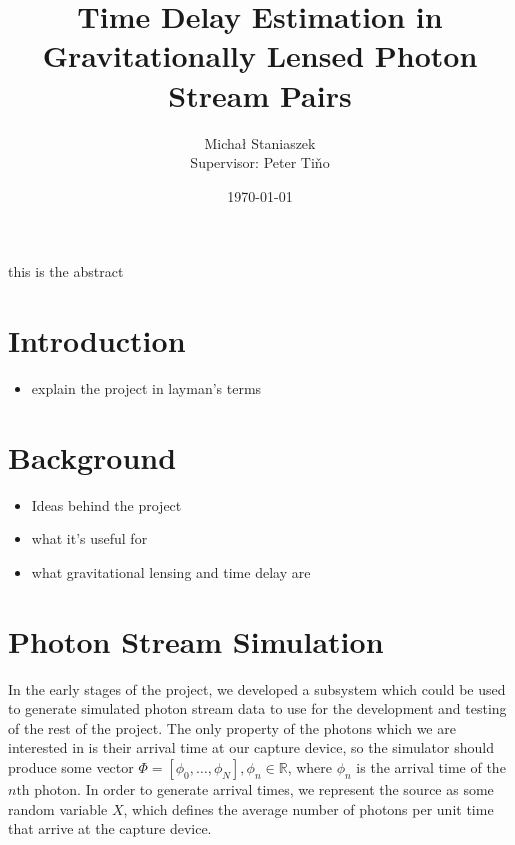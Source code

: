 \documentclass[a4paper,11pt]{article}
\title{Time Delay Estimation in Gravitationally Lensed Photon Stream Pairs}
\author{\Large{Micha{\l} Staniaszek} \\\small{Supervisor: Peter Ti{\v{n}}o}}
\date{\today}
\begin{document}
\maketitle


this is the abstract

\section{Introduction}
\label{sec-1}

\begin{itemize}
\item explain the project in layman's terms
\end{itemize}
\section{Background}
\label{sec-2}

\begin{itemize}
\item Ideas behind the project
\item what it's useful for
\item what gravitational lensing and time delay are
\end{itemize}
\section{Photon Stream Simulation}
\label{sec-3}

In the early stages of the project, we developed a subsystem which could be used
to generate simulated photon stream data to use for the development and testing
of the rest of the project. The only property of the photons which we are
interested in is their arrival time at our capture device, so the simulator
should produce some vector $\Phi=\left[\phi_0,\dots,\phi_N\right], \phi_n \in
\mathbb{R}$, where $\phi_n$ is the arrival time of the $n\text{th}$ photon. In
order to generate arrival times, we represent the source as some random variable
$X$, which defines the average number of photons per unit time that arrive at
the capture device.
\end{document}
